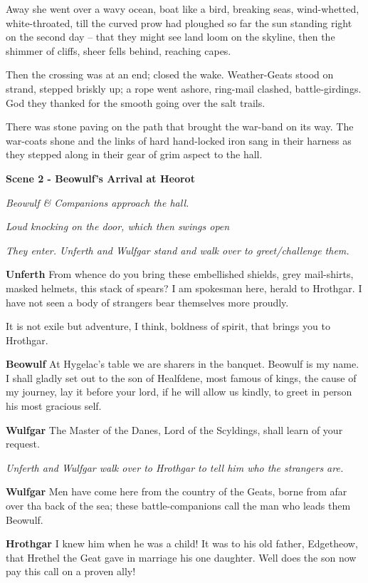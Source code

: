 \documentclass[a4paper]{article}
\begin{document}
{Away she went over a wavy ocean,
boat like a bird, breaking seas,
wind-whetted, white-throated,
till the curved prow had ploughed so far
the sun standing right on the second day –
that they might see land loom on the skyline,
then the shimmer of cliffs, sheer fells behind,
reaching capes.

Then the crossing was at an end;
closed the wake. Weather-Geats
stood on strand, stepped briskly up;
a rope went ashore, ring-mail clashed,
battle-girdings. God they thanked
for the smooth going over the salt trails.

There was stone paving on the path that brought
the war-band on its way. The war-coats shone
and the links of hard hand-locked iron
sang in their harness as they stepped along
in their gear of grim aspect to the hall.

\centerline{\textbf{Scene 2 - Beowulf's Arrival at Heorot}}
\centerline{\textit{Beowulf \& Companions approach the hall.}}
\centerline{\textit{Loud knocking on the door, which then swings open}}
\centerline{\textit{They enter. Unferth and Wulfgar stand and walk over to greet/challenge them.}}

\textbf{Unferth} From whence do you bring these embellished shields, 
grey mail-shirts, masked helmets, 
this stack of spears? I am spokesman here,
herald to Hrothgar. I have not seen
a body of strangers bear themselves more proudly.

It is not exile but adventure, I think,
boldness of spirit, that brings you to Hrothgar.

\textbf{Beowulf} At Hygelac's table we are sharers in the banquet.
Beowulf is my name.
I shall gladly set out to the son of Healfdene,
most famous of kings, the cause of my journey,
lay it before your lord, if he will allow us kindly,
to greet in person his most gracious self.

\textbf{Wulfgar} The Master of the Danes,
Lord of the Scyldings, shall learn of your request.

\centerline{\textit{Unferth and Wulfgar walk over to Hrothgar to tell him who the strangers are.}}

\textbf{Wulfgar} Men have come here from the country of the Geats,
borne from afar over tha back of the sea;
these battle-companions call the man who leads them Beowulf.

\textbf{Hrothgar} I knew him when he was a child!
It was to his old father, Edgetheow, that
Hrethel the Geat gave in marriage
his one daughter. Well does the son
now pay this call on a proven ally!

}
\end{document}
